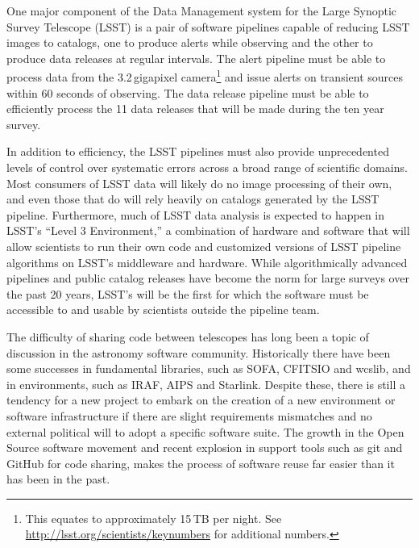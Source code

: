 \documentclass[]{spie}  %
\begin{document}
One major component of the Data Management system\cite{2016_adassxxv_O3-1} for the Large Synoptic Survey Telescope (LSST)\cite{2008arXiv0805.2366I,2016SPIE-Kahn,2014SPIE.9145E..1AG} is a pair of software pipelines capable of reducing LSST images to catalogs, one to produce alerts while observing and the other to produce data releases at regular intervals.
The alert pipeline must be able to process data from the 3.2\,gigapixel camera\footnote{This equates to approximately 15\,TB per night. See \url{http://lsst.org/scientists/keynumbers} for additional numbers.} and issue alerts on transient sources within 60 seconds of observing\cite{2014htu..conf...19K}.
The data release pipeline must be able to efficiently process the 11 data releases that will be made during the ten year survey.

In addition to efficiency, the LSST pipelines must also provide unprecedented levels of control over systematic errors across a broad range of scientific domains.
Most consumers of LSST data will likely do no image processing of their own, and even those that do will rely heavily on catalogs generated by the LSST pipeline.
Furthermore, much of LSST data analysis is expected to happen in LSST's ``Level 3 Environment,'' a combination of hardware and software that will allow scientists to run their own code and customized versions of LSST pipeline algorithms on LSST's middleware and hardware.
While algorithmically advanced pipelines and public catalog releases have become the norm for large surveys over the past 20 years, LSST's will be the first for which the software must be accessible to and usable by scientists outside the pipeline team.

The difficulty of sharing code between telescopes has long been a topic of discussion in the astronomy software community\cite{1998ASPC..145..142M,1999ASPC..172...11E,2001ASSL..266..163S,2002SPIE.4844..321E}.
Historically there have been some successes in fundamental libraries, such as SOFA\cite{2011SchpJ...611404H}, CFITSIO\cite{1999ASPC..172..487P} and wcslib\cite{2011ascl.soft08003C}, and in environments, such as IRAF\cite{1986SPIE..627..733T}, AIPS\cite{1996ASPC..101...37V} and Starlink\cite{1982QJRAS..23..485D}.
Despite these, there is still a tendency for a new project to embark on the creation of a new environment or software infrastructure if there are slight requirements mismatches and no external political will to adopt a specific software suite.
The growth in the Open Source software movement\cite{2006OpenSources} and recent explosion in support tools such as git and GitHub for code sharing\cite{2014IACWSLima}, makes the process of software reuse far easier than it has been in the past.
\end{document}
